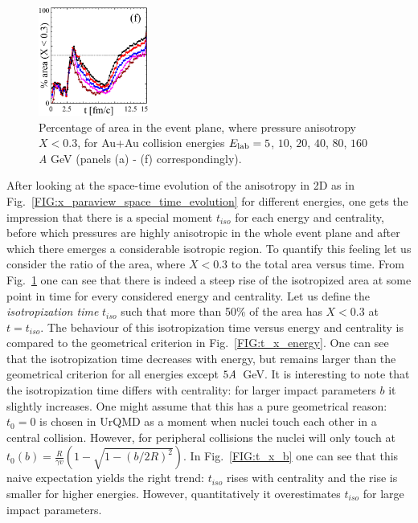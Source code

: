 \begin{figure}
  \includegraphics[width = 0.32\textwidth]{plots/thermalization_urqmd/plot_x_area_percentages_E160.pdf}
  \caption{Percentage of area in the event plane, where pressure anisotropy $X <
           0.3$, for Au+Au collision energies $E_\mathrm{lab} = 5$, $10$, $20$, $40$, $80$,
           $160$ \emph{A} GeV (panels (a) - (f) correspondingly).}
  \label{FIG:x_area_percentages}
\end{figure}

After looking at the space-time evolution of the anisotropy in 2D as in
Fig.~\ref{FIG:x_paraview_space_time_evolution} for different energies, one gets
the impression that there is a special moment $t_{iso}$ for each energy and
centrality, before which pressures are highly anisotropic in the whole event
plane and after which there emerges a considerable isotropic region. To quantify
this feeling let us consider the ratio of the area, where $X < 0.3$ to the total area
versus time. From Fig.~\ref{FIG:x_area_percentages} one can see that there is
indeed a steep rise of the isotropized area at some point in time for every considered
energy and centrality. Let us define the \emph{isotropization time} $t_{iso}$
such that more than 50\% of the area has $X < 0.3$ at $t = t_{iso}$. The
behaviour of this isotropization time versus energy and centrality is compared
to the geometrical criterion in Fig.~\ref{FIG:t_x_energy}. One can see that the
isotropization time decreases with energy, but remains larger than the
geometrical criterion for all energies except $5\emph{A}$~GeV. It is interesting
to note that the isotropization time differs with centrality: for larger impact
parameters $b$ it slightly increases. One might assume that this has a pure
geometrical reason: $t_0 = 0$ is chosen in UrQMD as a moment when nuclei touch
each other in a central collision. However, for peripheral collisions the nuclei
will only touch at $t_0(b) = \frac{R}{\gamma v} (1 - \sqrt{1 - (b/2R)^2})$. In
Fig.~\ref{FIG:t_x_b} one can see that this naive expectation yields the right
trend: $t_{iso}$ rises with centrality and the rise is smaller for higher
energies. However, quantitatively it overestimates $t_{iso}$ for large impact
parameters.

